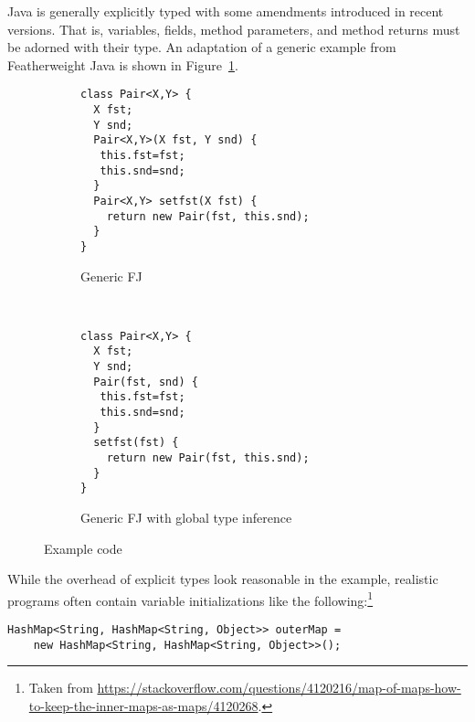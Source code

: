 Java is generally explicitly typed with some amendments introduced in
recent versions. That is, 
variables, fields, method parameters, and method returns must be
adorned with their type. An adaptation of a generic example from Featherweight Java
\cite{DBLP:journals/toplas/IgarashiPW01} 
is shown in Figure~\ref{fig:intro-example-generic-fj}.
\begin{figure}[tp]
  \begin{subfigure}[t]{0.49\linewidth}
\begin{lstlisting}
class Pair<X,Y> {
  X fst;
  Y snd;
  Pair<X,Y>(X fst, Y snd) {
   this.fst=fst;
   this.snd=snd;
  }
  Pair<X,Y> setfst(X fst) {
    return new Pair(fst, this.snd);
  }
}  
\end{lstlisting}
    \caption{Generic FJ}
    \label{fig:intro-example-generic-fj}
  \end{subfigure}
  ~
  \begin{subfigure}[t]{0.49\linewidth}
\begin{lstlisting}
class Pair<X,Y> {
  X fst;
  Y snd;
  Pair(fst, snd) {
   this.fst=fst; 
   this.snd=snd;
  }
  setfst(fst) {
    return new Pair(fst, this.snd);
  }
}  
\end{lstlisting}
    \caption{Generic FJ with global type inference}
    \label{fig:intro-example-generic-jtx}
  \end{subfigure}
  \caption{Example code}
  \label{fig:intro-example-code}
\end{figure}
While the overhead of explicit types look reasonable in the example,
realistic programs often contain variable initializations like
the following:\footnote{Taken from
  \url{https://stackoverflow.com/questions/4120216/map-of-maps-how-to-keep-the-inner-maps-as-maps/4120268}.} 
\begin{lstlisting}[basicstyle=\ttfamily\fontsize{8}{9.6}\selectfont]
  HashMap<String, HashMap<String, Object>> outerMap =
    new HashMap<String, HashMap<String, Object>>();
\end{lstlisting}

